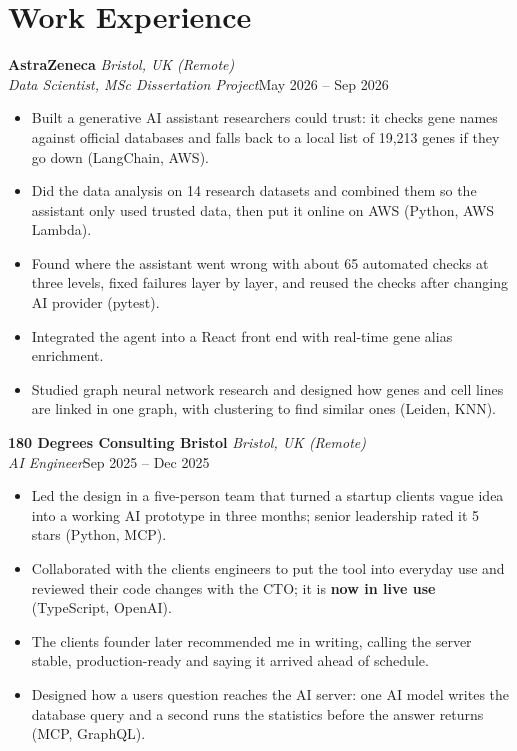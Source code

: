 \documentclass[a4paper,11pt]{article}
\newcommand{\role}[4]{%
  \textbf{#1}{\color{muted}\,\textperiodcentered\,\textit{#2}}\\
  \textit{#4}\hfill{\color{muted}#3}\par}
\newcommand{\gap}{\vspace{5pt}}
\newcommand{\num}[1]{\textbf{#1}}   %
\begin{document}
\section{Work Experience}
\role{AstraZeneca}{Bristol, UK (Remote)}{May 2026 – Sep 2026}{Data Scientist, MSc Dissertation Project}
\begin{itemize}
  \item Built a generative AI assistant researchers could trust: it checks gene names against official databases and falls back to a local list of 19,213 genes if they go down (LangChain, AWS).
  \item Did the data analysis on 14 research datasets and combined them so the assistant only used trusted data, then put it online on AWS (Python, AWS Lambda).
  \item Found where the assistant went wrong with about 65 automated checks at three levels, fixed failures layer by layer, and reused the checks after changing AI provider (pytest).
  \item Integrated the agent into a React front end with real-time gene alias enrichment.
  \item Studied graph neural network research and designed how genes and cell lines are linked in one graph, with clustering to find similar ones (Leiden, KNN).
\end{itemize}
\gap
{}
\role{180 Degrees Consulting Bristol}{Bristol, UK (Remote)}{Sep 2025 – Dec 2025}{AI Engineer}
\begin{itemize}
  \item Led the design in a five-person team that turned a startup client\textquotesingle{}s vague idea into a working AI prototype in three months; senior leadership rated it 5 stars (Python, MCP).
  \item Collaborated with the client\textquotesingle{}s engineers to put the tool into everyday use and reviewed their code changes with the CTO; it is \num{now in live use} (TypeScript, OpenAI).
  \item The client\textquotesingle{}s founder later recommended me in writing, calling the server \textquotesingle{}stable, production-ready\textquotesingle{} and saying it arrived ahead of schedule.
  \item Designed how a user\textquotesingle{}s question reaches the AI server: one AI model writes the database query and a second runs the statistics before the answer returns (MCP, GraphQL).
\end{itemize}
\end{document}
